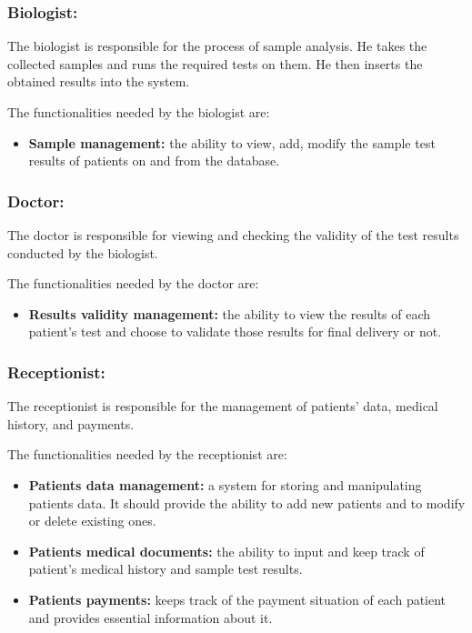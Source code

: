 \documentclass{article}
\begin{document}
\subsubsection*{Biologist:}

The biologist is responsible for the process of sample analysis. He takes the collected samples and runs the required tests on them. He then inserts the obtained results into the system.

\noindent The functionalities needed by the biologist are:

\begin{itemize}
    \item \textbf{Sample management:} the ability to view, add, modify the sample test results of patients on and from the database.
\end{itemize}

\subsubsection*{Doctor:}

The doctor is responsible for viewing and checking the validity of the  test results conducted by the biologist.

\noindent The functionalities needed by the doctor are:

\begin{itemize}

\item \textbf{Results validity management:} the ability to view the results of each patient's test and choose to validate those results for final delivery or not.

\end{itemize}


\subsubsection*{Receptionist:}

The receptionist is responsible for the management of patients' data, medical history, and payments.

\noindent The functionalities needed by the receptionist are:

\begin{itemize}

\item \textbf{Patients data management:} a system for storing and manipulating patients data. It should provide the ability to add new patients and to modify or delete existing ones.

\item \textbf{Patients medical documents:} the ability to input and keep track of patient's medical history and sample test results.

\item \textbf{Patients payments:} keeps track of the payment situation of each patient and provides essential information about it.

\end{itemize}
\end{document}

